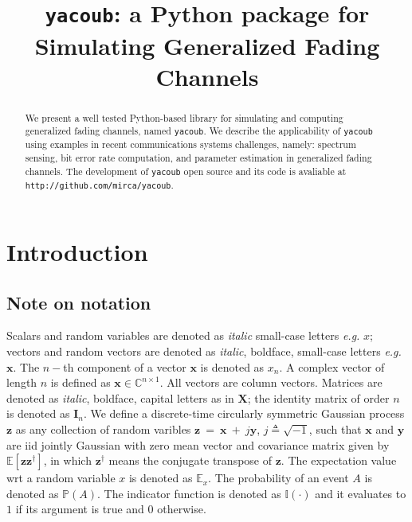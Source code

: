 \documentclass[conference, 10pt]{IEEEtran}
\begin{document}
\title{\texttt{yacoub}: a Python package for Simulating Generalized Fading Channels}

\author{
}

\maketitle

\begin{abstract}
    We present a well tested Python-based library for simulating and computing
    generalized fading channels, named \texttt{yacoub}. We describe the
    applicability of \texttt{yacoub} using examples in recent communications
    systems challenges, namely: spectrum sensing, bit error rate computation,
    and parameter estimation in generalized fading channels. The development of
    \texttt{yacoub} open source and its code is avaliable at
    \texttt{http://github.com/mirca/yacoub}.
\end{abstract}

\IEEEpeerreviewmaketitle
\section{Introduction}

\subsection{Note on notation}
Scalars and random variables are denoted as \textit{italic} small-case letters \textit{e.g.} $x$;
vectors and random vectors are denoted as \textit{italic}, boldface, small-case letters \textit{e.g.} $\bm{x}$.
The $n-$th component of a vector $\bm{x}$ is denoted as $x_n$.
A complex vector of length $n$ is defined as $\bm{x} \in \mathbb{C}^{n\times 1}$. All
vectors are column vectors. Matrices are denoted as \textit{italic}, boldface, capital
letters as in $\bm{X}$; the identity matrix of order $n$ is denoted as $\bm{I}_n$.
We define a discrete-time circularly symmetric Gaussian process $\bm{z}$ as any collection
of random varibles $\bm{z}~=~\bm{x}~+~j\bm{y}$, $j \triangleq \sqrt{-1}$, such that
$\bm{x}$ and $\bm{y}$ are iid jointly Gaussian with zero mean vector and covariance
matrix given by $\mathbb{E}\left[\bm{z}\bm{z}^{\dagger}\right]$, in which $\bm{z}^\dagger$
means the conjugate transpose of $\bm{z}$. The expectation value wrt a random variable $x$
is denoted as $\mathbb{E}_x$. The probability of an event $A$ is denoted as $\mathbb{P}(A)$.
The indicator function is denoted as $\mathbb{I}(\cdot)$ and it evaluates to $1$ if its
argument is true and $0$ otherwise.
\end{document}

